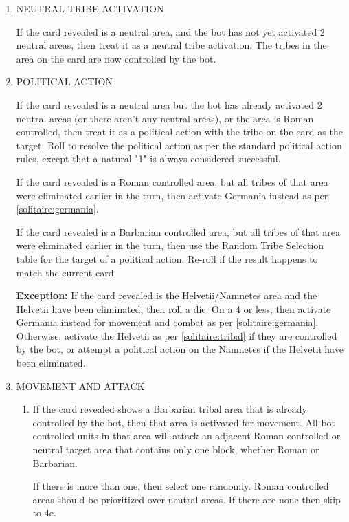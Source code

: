 \renewcommand{\labelenumii}{\alph{enumii}.}
\begin{enumerate}
  \item NEUTRAL TRIBE ACTIVATION

  If the card revealed is a neutral area, and the bot has not yet activated 2 neutral areas, then treat it as a neutral tribe activation. The tribes in the area on the card are now controlled by the bot.

  \item POLITICAL ACTION
  
  If the card revealed is a neutral area but the bot has already activated 2 neutral areas (or there aren't any neutral areas), or the area is Roman controlled, then treat it as a political action with the tribe on the card as the target. Roll to resolve the political action as per the standard political action rules, except that a natural "1" is always considered successful.
  
  If the card revealed is a Roman controlled area, but all tribes of that area were eliminated earlier in the turn, then activate Germania instead as per \ref{solitaire:germania}.
  
  If the card revealed is a Barbarian controlled area, but all tribes of that area were eliminated earlier in the turn, then use the Random Tribe Selection table for the target of a political action. Re-roll if the result happens to match the current card.
  
  \textbf{Exception:} If the card revealed is the Helvetii/Namnetes area and the Helvetii have been eliminated, then roll a die. On a 4 or less, then activate Germania instead for movement and combat as per \ref{solitaire:germania}. Otherwise, activate the Helvetii as per \ref{solitaire:tribal} if they are controlled by the bot, or attempt a political action on the Namnetes if the Helvetii have been eliminated.

  \item MOVEMENT AND ATTACK

  \begin{enumerate}[leftmargin=0in]
    \item \label{solitaire:tribal} If the card revealed shows a Barbarian tribal area that is already controlled by the bot, then that area is activated for movement. All bot controlled units in that area will attack an adjacent Roman controlled or neutral target area that contains only one block, whether Roman or Barbarian.
    
    If there is more than one, then select one randomly. Roman controlled areas should be prioritized over neutral areas. If there are none then skip to 4e.
    

\end{enumerate}
\end{enumerate}
